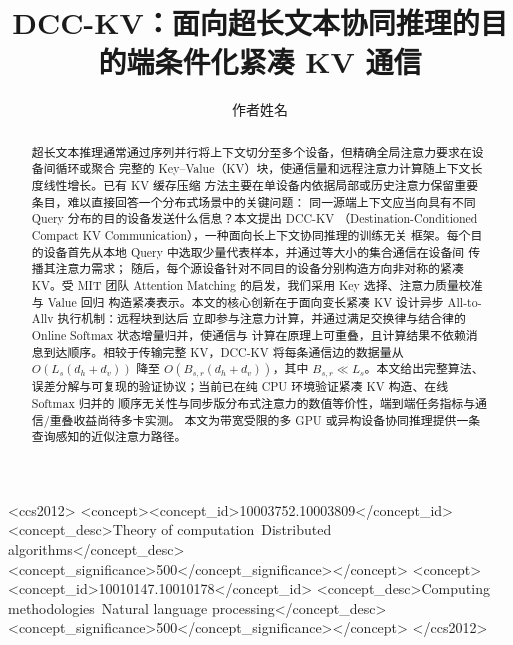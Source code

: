 \documentclass[sigconf,nonacm]{acmart}
\begin{document}
\title{DCC-KV：面向超长文本协同推理的目的端条件化紧凑 KV 通信}

\author{作者姓名}

\begin{abstract}
超长文本推理通常通过序列并行将上下文切分至多个设备，但精确全局注意力要求在设备间循环或聚合
完整的 Key--Value（KV）块，使通信量和远程注意力计算随上下文长度线性增长。已有 KV 缓存压缩
方法主要在单设备内依据局部或历史注意力保留重要条目，难以直接回答一个分布式场景中的关键问题：
同一源端上下文应当向具有不同 Query 分布的目的设备发送什么信息？本文提出 DCC-KV
（Destination-Conditioned Compact KV Communication），一种面向长上下文协同推理的训练无关
框架。每个目的设备首先从本地 Query 中选取少量代表样本，并通过等大小的集合通信在设备间
传播其注意力需求；
随后，每个源设备针对不同目的设备分别构造方向非对称的紧凑 KV。受 MIT 团队 Attention Matching
\cite{zweiger2026attentionmatching} 的启发，我们采用 Key 选择、注意力质量校准与 Value 回归
构造紧凑表示。本文的核心创新在于面向变长紧凑 KV 设计异步 All-to-Allv 执行机制：远程块到达后
立即参与注意力计算，并通过满足交换律与结合律的 Online Softmax 状态增量归并，使通信与
计算在原理上可重叠，且计算结果不依赖消息到达顺序。相较于传输完整 KV，DCC-KV 将每条通信边的数据量从
$O(L_s(d_h+d_v))$ 降至 $O(B_{s,r}(d_h+d_v))$，其中 $B_{s,r} \ll L_s$。本文给出完整算法、
误差分解与可复现的验证协议；当前已在纯 CPU 环境验证紧凑 KV 构造、在线 Softmax 归并的
顺序无关性与同步版分布式注意力的数值等价性，端到端任务指标与通信/重叠收益尚待多卡实测。
本文为带宽受限的多 GPU 或异构设备协同推理提供一条查询感知的近似注意力路径。
\end{abstract}

\begin{CCSXML}
<ccs2012>
   <concept><concept_id>10003752.10003809</concept_id>
     <concept_desc>Theory of computation~Distributed algorithms</concept_desc>
     <concept_significance>500</concept_significance></concept>
   <concept><concept_id>10010147.10010178</concept_id>
     <concept_desc>Computing methodologies~Natural language processing</concept_desc>
     <concept_significance>500</concept_significance></concept>
</ccs2012>
\end{CCSXML}

\end{document}
